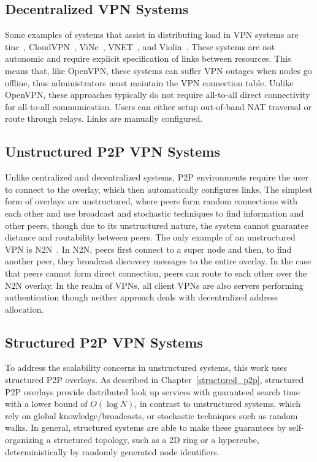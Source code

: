 \subsection{Decentralized VPN Systems}
Some examples of systems that assist in distributing load in VPN systems are
tinc~\cite{tinc}, CloudVPN~\cite{cloudvpn}, ViNe~\cite{vine}, VNET~\cite{vnet},
and Violin~\cite{violin}.  These systems are not autonomic and require explicit
specification of links between resources.  This means that, like OpenVPN, these
systems can suffer VPN outages when nodes go offline, thus administrators must
maintain the VPN connection table.  Unlike OpenVPN, these approaches typically
do not require all-to-all direct connectivity for all-to-all communication.
Users can either setup out-of-band NAT traversal or route through relays.  Links
are manually configured.

\subsection{Unstructured P2P VPN Systems}
Unlike centralized and decentralized systems, P2P environments require the
user to connect to the overlay, which then automatically configures links.
The simplest form of overlays are unstructured, where peers form random
connections with each other and use broadcast and stochastic techniques to find
information and other peers, though due to its unstructured nature, the system
cannot guarantee distance and routability between peers.  The only example of
an unstructured VPN is N2N~\cite{n2n}.  In N2N, peers first connect to a super
node and then, to find another peer, they broadcast discovery messages to the
entire overlay.  In the case that peers cannot form direct connection, peers
can route to each other over the N2N overlay.  In the realm of VPNs, all client
VPNs are also servers performing authentication though neither approach deals
with decentralized address allocation.

\subsection{Structured P2P VPN Systems}
To address the scalability concerns in unstructured systems, this work uses
structured P2P overlays.  As described in Chapter~\ref{structured_p2p},
structured P2P overlays provide distributed look up services with guaranteed
search time with a lower bound of $O(\log N)$, in contrast to unstructured
systems, which rely on global knowledge/broadcasts, or stochastic techniques
such as random walks.  In general, structured systems are able to make these
guarantees by self-organizing a structured topology, such as a 2D ring or a
hypercube, deterministically by randomly generated node identifiers.


